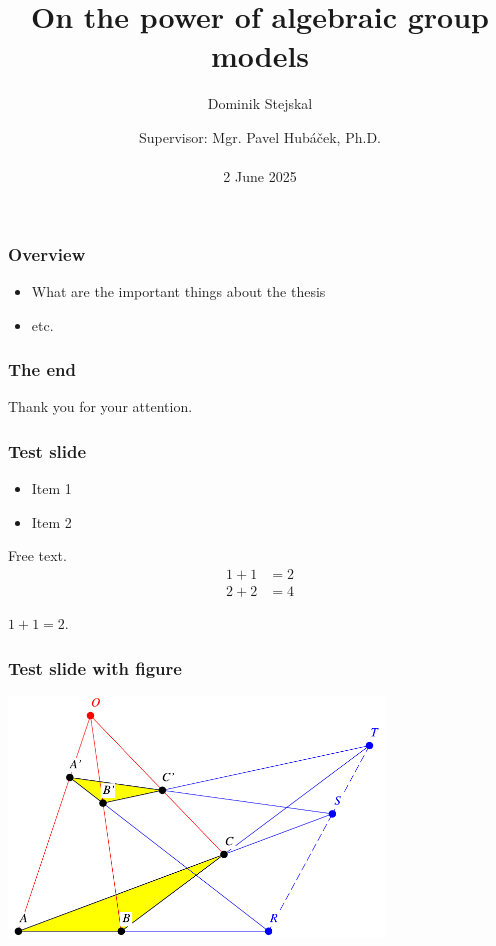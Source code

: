 \documentclass[9pt]{beamer}
\title{On the power of algebraic group models}
\author{Dominik Stejskal}
\date{Supervisor: Mgr. Pavel Hubáček, Ph.D.\\ \, \\2 June 2025}
\begin{document}
\frame{\titlepage}




\begin{frame}
\frametitle{Overview}
\begin{itemize}
\item What are the important things about the thesis
\item etc.
\end{itemize}
\end{frame}


\begin{frame}
\frametitle{The end}
Thank you for your attention.
\end{frame}


\begin{frame}
\frametitle{Test slide}
\begin{itemize}
\item Item 1
\item Item 2
\end{itemize}
Free text.
\begin{align*}
1 + 1 &= 2 \\
2 + 2 &= 4
\end{align*}
\begin{theorem}
$ 1+1=2. $
\end{theorem}
\end{frame}


\begin{frame}
\frametitle{Test slide with figure}
\centering
    \includegraphics[width=10cm]{Desargues.pdf}
\end{frame}
\end{document}
